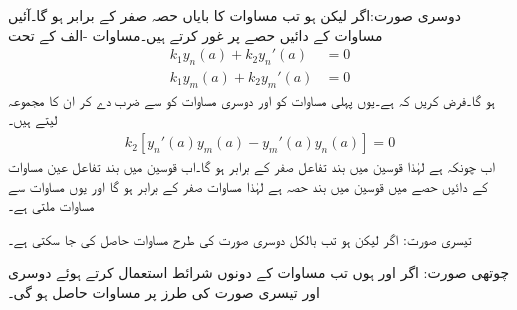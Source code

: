 دوسری صورت:اگر  لیکن  ہو تب مساوات  کا بایاں حصہ صفر کے برابر ہو گا۔آئیں مساوات  کے دائیں حصے پر غور کرتے ہیں۔مساوات -الف کے تحت
\begin{align*}
k_1y_n(a)+k_2y_n'(a)&=0\\
k_1y_m(a)+k_2y_m'(a)&=0
\end{align*}
ہو گا۔فرض کریں کہ  ہے۔یوں پہلی مساوات کو  اور دوسری مساوات کو  سے ضرب دے کر ان کا مجموعہ لیتے ہیں۔
\begin{align*}
k_2[y_n'(a)y_m(a)-y_m'(a)y_n(a)]=0
\end{align*} 
اب چونکہ  ہے لہٰذا قوسین میں بند تفاعل صفر کے برابر ہو گا۔اب قوسین میں بند تفاعل عین مساوات  کے دائیں حصے میں قوسین میں بند حصہ ہے لہٰذا مساوات  صفر کے برابر ہو گا اور یوں مساوات  سے  مساوات  ملتی ہے۔

تیسری صورت: اگر  لیکن  ہو تب بالکل دوسری صورت کی طرح مساوات  حاصل کی جا سکتی ہے۔

چوتھی صورت: اگر  اور  ہوں تب مساوات  کے دونوں شرائط استعمال کرتے ہوئے  دوسری اور تیسری صورت کی طرز پر  مساوات  حاصل ہو گی۔


